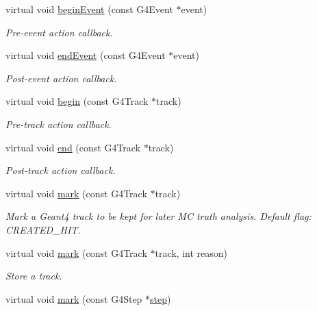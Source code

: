 \begin{DoxyCompactItemize}
virtual void \hyperlink{class_d_d4hep_1_1_simulation_1_1_geant4_particle_handler_adfcc944cca3597fac178ccebbc405a1f}{begin\+Event} (const G4\+Event $\ast$event)
\begin{DoxyCompactList}\small\item\em Pre-\/event action callback. \end{DoxyCompactList}\item 
virtual void \hyperlink{class_d_d4hep_1_1_simulation_1_1_geant4_particle_handler_a6b0ac9f15f1c1280ad81ddc1faf3d417}{end\+Event} (const G4\+Event $\ast$event)
\begin{DoxyCompactList}\small\item\em Post-\/event action callback. \end{DoxyCompactList}\item 
virtual void \hyperlink{class_d_d4hep_1_1_simulation_1_1_geant4_particle_handler_af967feef838b477f95b5fdd8dd828489}{begin} (const G4\+Track $\ast$track)
\begin{DoxyCompactList}\small\item\em Pre-\/track action callback. \end{DoxyCompactList}\item 
virtual void \hyperlink{class_d_d4hep_1_1_simulation_1_1_geant4_particle_handler_a6983068cd3f90fb922cb89378a85770e}{end} (const G4\+Track $\ast$track)
\begin{DoxyCompactList}\small\item\em Post-\/track action callback. \end{DoxyCompactList}\item 
virtual void \hyperlink{class_d_d4hep_1_1_simulation_1_1_geant4_particle_handler_a50e23a41d610fd19644a8393da13305b}{mark} (const G4\+Track $\ast$track)
\begin{DoxyCompactList}\small\item\em Mark a Geant4 track to be kept for later MC truth analysis. Default flag\+: C\+R\+E\+A\+T\+E\+D\+\_\+\+H\+IT. \end{DoxyCompactList}\item 
virtual void \hyperlink{class_d_d4hep_1_1_simulation_1_1_geant4_particle_handler_a3ad0a4c70220326e76da4dd79c95501c}{mark} (const G4\+Track $\ast$track, int reason)
\begin{DoxyCompactList}\small\item\em Store a track. \end{DoxyCompactList}\item 
virtual void \hyperlink{class_d_d4hep_1_1_simulation_1_1_geant4_particle_handler_aa03024ccc930c57fcfcd515605072f4b}{mark} (const G4\+Step $\ast$\hyperlink{class_d_d4hep_1_1_simulation_1_1_geant4_particle_handler_abb534226cfb8d022077d48681226a179}{step})

\end{DoxyCompactItemize}
